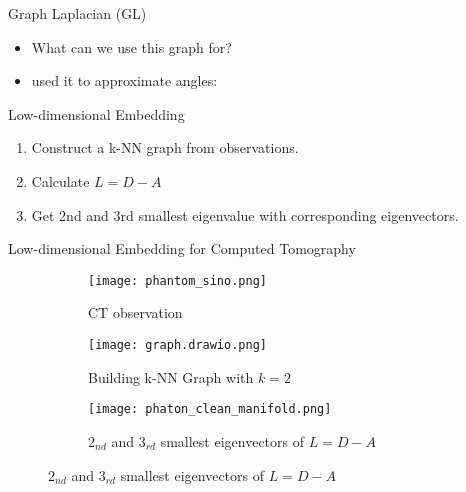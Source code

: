 \begin{frame}{Graph Laplacian (GL)}
\begin{itemize}
  \item What can we use this graph for?
  \item \cite{LaplaceRandomProjections} used it to approximate angles:
\end{itemize}

\begin{block}{Low-dimensional Embedding}
  \begin{enumerate}
    \item Construct a k-NN graph from observations.
    \item Calculate $L = D - A $
    \item Get 2nd and 3rd smallest eigenvalue with corresponding eigenvectors.
  \end{enumerate}
\end{block}

\end{frame}


\begin{frame}{Low-dimensional Embedding for Computed Tomography}
  \begin{figure}
    \centering
    \begin{subfigure}[t]{0.3\textwidth}
        \texttt{[image: phantom\_sino.png]}
        \caption{CT observation}
    \end{subfigure} \hfill
    \begin{subfigure}[t]{0.3\textwidth}
        \texttt{[image: graph.drawio.png]}
        \caption{Building k-NN Graph with $ k = 2$ }
    \end{subfigure}\hfill
    \begin{subfigure}[t]{0.3\textwidth}
      \texttt{[image: phaton\_clean\_manifold.png]}
      \caption{$2_{nd}$ and $3_{rd}$ smallest eigenvectors of  $L =  D - A$}
  \end{subfigure}
\end{figure}
  
\end{frame}


